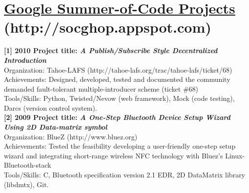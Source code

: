 \documentclass[notopicbreak,contbibnum,plain]{simplecv}
\begin{document}
\section{\textbf{\underline{Google Summer-of-Code Projects}} (http://socghop.appspot.com)}
\vspace*{-0.3cm}
\textbf{[1] 2010 Project title: \textit{A Publish/Subscribe Style Decentralized Introduction}}\\
Organization: Tahoe-LAFS (http://tahoe-lafs.org/trac/tahoe-lafs/ticket/68)\\
Achievements: Designed, developed, tested and documented the community demanded fault-tolerant multiple-introducer scheme (ticket \#68)\\
Tools/Skills: Python, Twisted/Nevow (web framework), Mock (code testing), Darcs (version control system).\\
\textbf{[2] 2009 Project title: \textit{A One-Step Bluetooth Device Setup Wizard Using 2D Data-matrix symbol}}\\
Organization: BlueZ (http://www.bluez.org)\\
Achievements: Tested the feasibility developing a user-friendly one-step setup wizard and integrating short-range wireless NFC technology with Bluez's Linux-Bluetooth-stack\\
Tools/Skills: C, Bluetooth specification version 2.1 EDR, 2D DataMatrix library (libdmtx), Git.
\vspace*{-0.3cm}
\end{document}

